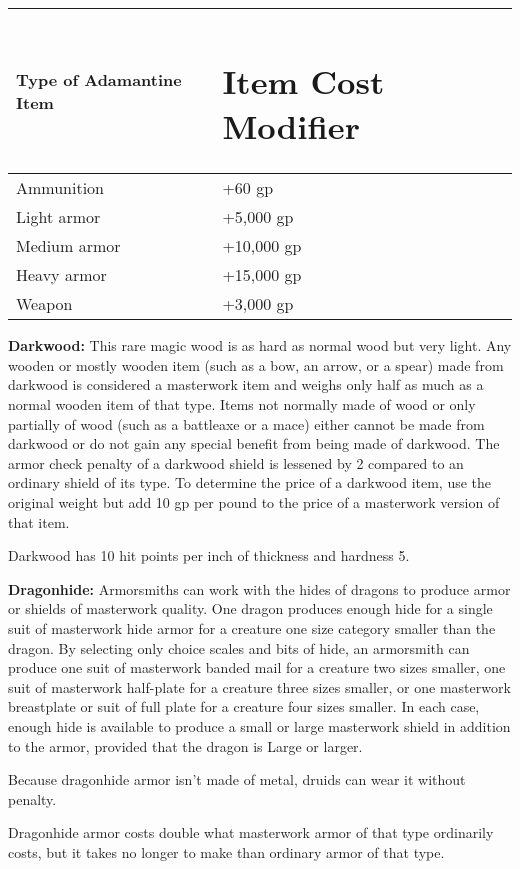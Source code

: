 \documentclass{article}
\begin{document}
\begin{tabular}{|>{\raggedright}p{114pt}|>{\raggedright}p{86pt}|}
\hline
T\textbf{ype of Adamantine Item} & \section*{I\textbf{tem Cost Modifier}}\tabularnewline
\hline
Ammunition & +60 gp\tabularnewline
\hline
Light armor & +5,000 gp\tabularnewline
\hline
Medium armor & +10,000 gp\tabularnewline
\hline
Heavy armor & +15,000 gp\tabularnewline
\hline
Weapon & +3,000 gp\tabularnewline
\hline
\end{tabular}

\vspace{12pt}
\textbf{Darkwood:} This rare magic wood is as hard as normal wood but very light. 
Any wooden or mostly wooden item (such as a bow, an arrow, or a spear) made from 
darkwood is considered a masterwork item and weighs only half as much as a normal 
wooden item of that type. Items not normally made of wood or only partially of 
wood (such as a battleaxe or a mace) either cannot be made from darkwood or do 
not gain any special benefit from being made of darkwood. The armor check penalty 
of a darkwood shield is lessened by 2 compared to an ordinary shield of its type. 
To determine the price of a darkwood item, use the original weight but add 10 gp 
per pound to the price of a masterwork version of that item.

Darkwood has 10 hit points per inch of thickness and hardness 5.

\vspace{12pt}
\textbf{Dragonhide:} Armorsmiths can work with the hides of dragons to produce 
armor or shields of masterwork quality. One dragon produces enough hide for a single 
suit of masterwork hide armor for a creature one size category smaller than the 
dragon. By selecting only choice scales and bits of hide, an armorsmith can produce 
one suit of masterwork banded mail for a creature two sizes smaller, one suit of 
masterwork half-plate for a creature three sizes smaller, or one masterwork breastplate 
or suit of full plate for a creature four sizes smaller. In each case, enough hide 
is available to produce a small or large masterwork shield in addition to the armor, 
provided that the dragon is Large or larger.

Because dragonhide armor isn't made of metal, druids can wear it without penalty.

Dragonhide armor costs double what masterwork armor of that type ordinarily costs, 
but it takes no longer to make than ordinary armor of that type.
\end{document}
